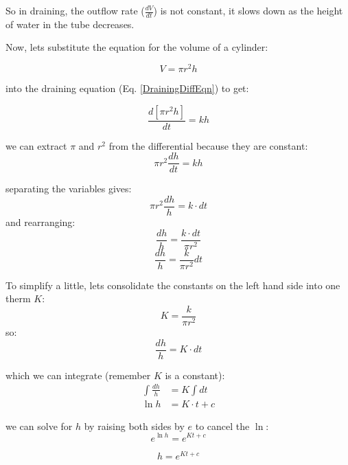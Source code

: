 \documentclass[11pt,fleqn]{article}
\begin{document}
	So in draining, the outflow rate ($\frac{dV}{dt}$) is not constant, it slows down as the height of water in the tube decreases. 
	
	Now, lets substitute the equation for the volume of a cylinder:
	
	\begin{equation}
		V = \pi r^2 h
	\end{equation}
	
	into the draining equation (Eq. \ref{DrainingDiffEqn}) to get:
	
	\begin{equation}
		\frac{d[\pi r^2 h]}{dt} = k h
	\end{equation}

	we can extract $\pi$ and $r^2$ from the differential because they are constant:
	\begin{equation}
		\pi r^2 \frac{dh}{dt} = k h
	\end{equation}

	separating the variables gives:
	\begin{equation}
		\pi r^2 \frac{dh}{h} = k \cdot dt
	\end{equation}
	and rearranging:
	\begin{equation}
		\frac{dh}{h} = \frac{k \cdot dt}{\pi r^2 }
	\end{equation}
	\begin{equation}
		\frac{dh}{h} = \frac{k}{\pi r^2 } dt
	\end{equation}

	To simplify a little, lets consolidate the constants on the left hand side into one therm $K$:
	\begin{equation}
		K = \frac{k}{\pi r^2 }
	\end{equation}
	so:
	\begin{equation}
		\frac{dh}{h} = K \cdot dt 
	\end{equation}
	
	which we can integrate (remember $K$ is a constant):
	\begin{align}
		\int \frac{dh}{h} &= K \int dt \\
		\ln{h} &= K \cdot t + c
	\end{align}
	
	we can solve for $h$ by raising both sides by $e$ to cancel the $\ln$:
	\begin{equation}
		e^{\ln{h}} = e^{K t + c}
	\end{equation}

	\begin{equation}
		h = e^{K t + c}
	\end{equation}
\end{document}
